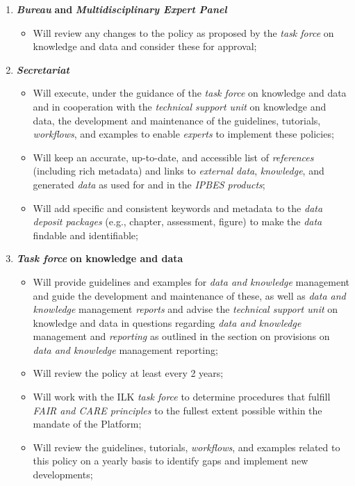 \documentclass{article}
\begin{document}
\begin{enumerate}[label=(\alph*)] %
    \item \textit{\textbf{Bureau }}\textbf{and }\textit{\textbf{Multidisciplinary Expert Panel}}
    \begin{itemize}
        \item Will review any changes to the policy as proposed by the \textit{task force} on knowledge and data and consider these for approval;
    \end{itemize}

    \item \textit{\textbf{Secretariat}}
    \begin{itemize}
        \item Will execute, under the guidance of the \textit{task force} on knowledge and data and in cooperation with the \textit{technical support unit} on knowledge and data, the development and maintenance of the guidelines, tutorials, \textit{workflows}, and examples to enable \textit{experts} to implement these policies;
        \item Will keep an accurate, up-to-date, and accessible list of \textit{references} (including rich metadata) and links to \textit{external data}, \textit{knowledge}, and generated \textit{data} as used for and in the \textit{IPBES products};
        \item Will add specific and consistent keywords and metadata to the \textit{data deposit packages} (e.g., chapter, assessment, figure) to make the \textit{data} findable and identifiable;
    \end{itemize}

    \item \textit{\textbf{Task force}}\textbf{ on knowledge and data}
    \begin{itemize}
        \item Will provide guidelines and examples for \textit{data and knowledge} management and guide the development and maintenance of these, as well as \textit{data and knowledge} management \textit{reports} and advise the \textit{technical support unit} on knowledge and data in questions regarding \textit{data and knowledge} management and \textit{reporting} as outlined in the section on provisions on \textit{data and knowledge} management reporting;
        \item Will review the policy at least every 2 years;
        \item Will work with the ILK \textit{task force} to determine procedures that fulfill \textit{FAIR and CARE principles} to the fullest extent possible within the mandate of the Platform;
        \item Will review the guidelines, tutorials, \textit{workflows}, and examples related to this policy on a yearly basis to identify gaps and implement new developments;
    \end{itemize}


\end{enumerate}
\end{document}
